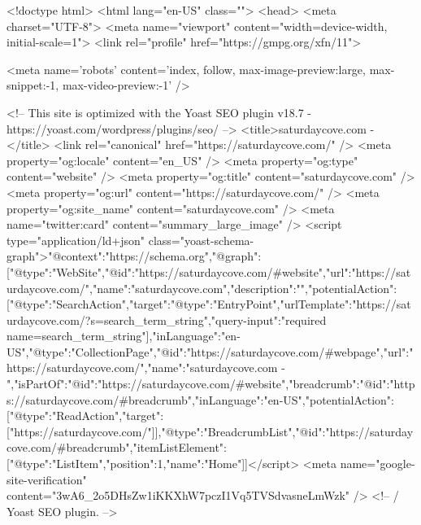 <!doctype html>
<html lang="en-US" class="">
	<head>
		<meta charset="UTF-8">
		<meta name="viewport" content="width=device-width, initial-scale=1">
		<link rel="profile" href="https://gmpg.org/xfn/11">

		
		<meta name='robots' content='index, follow, max-image-preview:large, max-snippet:-1, max-video-preview:-1' />

	<!-- This site is optimized with the Yoast SEO plugin v18.7 - https://yoast.com/wordpress/plugins/seo/ -->
	<title>saturdaycove.com -</title>
	<link rel="canonical" href="https://saturdaycove.com/" />
	<meta property="og:locale" content="en_US" />
	<meta property="og:type" content="website" />
	<meta property="og:title" content="saturdaycove.com" />
	<meta property="og:url" content="https://saturdaycove.com/" />
	<meta property="og:site_name" content="saturdaycove.com" />
	<meta name="twitter:card" content="summary_large_image" />
	<script type="application/ld+json" class="yoast-schema-graph">{"@context":"https://schema.org","@graph":[{"@type":"WebSite","@id":"https://saturdaycove.com/#website","url":"https://saturdaycove.com/","name":"saturdaycove.com","description":"","potentialAction":[{"@type":"SearchAction","target":{"@type":"EntryPoint","urlTemplate":"https://saturdaycove.com/?s={search_term_string}"},"query-input":"required name=search_term_string"}],"inLanguage":"en-US"},{"@type":"CollectionPage","@id":"https://saturdaycove.com/#webpage","url":"https://saturdaycove.com/","name":"saturdaycove.com -","isPartOf":{"@id":"https://saturdaycove.com/#website"},"breadcrumb":{"@id":"https://saturdaycove.com/#breadcrumb"},"inLanguage":"en-US","potentialAction":[{"@type":"ReadAction","target":["https://saturdaycove.com/"]}]},{"@type":"BreadcrumbList","@id":"https://saturdaycove.com/#breadcrumb","itemListElement":[{"@type":"ListItem","position":1,"name":"Home"}]}]}</script>
	<meta name="google-site-verification" content="3wA6_2o5DHsZw1iKKXhW7pczI1Vq5TVSdvasneLmWzk" />
	<!-- / Yoast SEO plugin. -->


